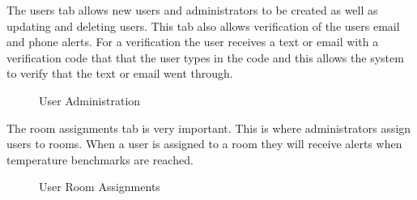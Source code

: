 \documentclass{report}
\begin{document}
\indent
The users tab allows new users and administrators to be created as well as updating and deleting users. This tab also allows verification of the users email and phone alerts. For a verification the user receives a text or email with a verification code that that the user types in the code and this allows the system to verify that the text or email went through.
\begin{figure}[H]
	\caption{User Administration}
\end{figure}
\newpage

\indent
The room assignments tab is very important. This is where administrators assign users to rooms. When a user is assigned to a room they will receive alerts when temperature benchmarks are reached.
\begin{figure}[H]
	\caption{User Room Assignments}
\end{figure}
\newpage
\end{document}
